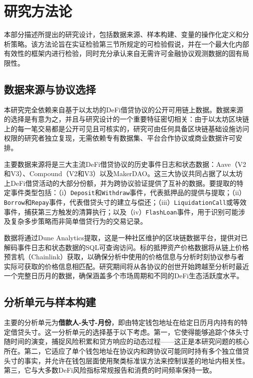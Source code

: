 \section{研究方法论}

本部分描述所提出的研究设计，包括数据来源、样本构建、变量的操作化定义和分析策略。该方法论旨在实证检验第三节所规定的可检验假说，并在一个最大化内部有效性的框架内进行检验，同时充分承认来自无需许可金融协议观测数据的固有局限性。

\subsection{数据来源与协议选择}

本研究完全依赖来自基于以太坊的DeFi借贷协议的公开可用链上数据。数据来源的选择是有意为之，并且与研究设计的一个重要特征密切相关：由于以太坊区块链上的每一笔交易都是公开可见且可核实的，研究可由任何具备区块链基础设施访问权限的研究者独立复现，无需依赖专有数据集、平台合作协议或商业数据许可安排。

主要数据来源将是三大主流DeFi借贷协议的历史事件日志和状态数据：Aave（V2和V3）、Compound（V2和V3）以及MakerDAO。这三大协议共同占据了以太坊上DeFi借贷活动的大部分份额，并为跨协议验证提供了互补的数据。要提取的特定事件类型包括：（i）\texttt{Deposit}和\texttt{Withdraw}事件，代表抵押品的提供与提取；（ii）\texttt{Borrow}和\texttt{Repay}事件，代表借贷头寸的建立与偿还；（iii）\texttt{LiquidationCall}或等效事件，捕获第三方触发的清算执行；以及（iv）\texttt{FlashLoan}事件，用于识别可能涉及复杂多步策略而非简单借贷行为的交易记录。

数据将通过Dune Analytics提取，这是一种社区维护的区块链数据平台，提供对已解码事件日志和状态数据的SQL可查询访问。标的抵押资产价格数据将从链上价格预言机（Chainlink）获取，以确保分析中使用的价格信息与分析时刻协议参与者实际可获取的价格信息相匹配。研究期间将从各协议的创世开始跨越至分析时最近一个完整日历月的数据，确保涵盖多个市场周期和不同的DeFi生态活跃度水平。

\subsection{分析单元与样本构建}

主要的分析单元为\textbf{借款人-头寸-月份}，即由特定钱包地址在给定日历月内持有的特定借贷头寸。这一分析单元的选择基于以下考虑。第一，它使得能够追踪个体头寸随时间的演变，捕捉风险积累和贷方响应的动态过程——这正是本研究问题的核心所在。第二，它适应了单个钱包地址在协议内和跨协议可能同时持有多个独立借贷头寸的事实，并允许在钱包层面使用聚类标准误方法来控制误差的地址内相关性。第三，它与大多数DeFi风险指标常规报告和消费的时间频率保持一致。

